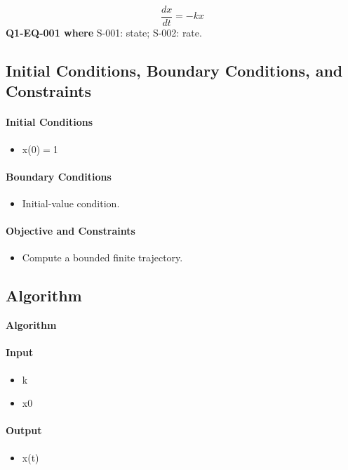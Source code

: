\documentclass[11pt]{article}
\begin{document}
\begin{equation}\label{eq:Q1-EQ-001}
\frac{dx}{dt}=-kx
\end{equation}
\noindent\textbf{Q1-EQ-001 where} S-001: state; S-002: rate.

\subsection{Initial Conditions, Boundary Conditions, and Constraints}

\paragraph{Initial Conditions}
\begin{itemize}\raggedright
\item x(0)\ensuremath{=}1
\end{itemize}

\paragraph{Boundary Conditions}
\begin{itemize}\raggedright
\item Initial-value condition.
\end{itemize}

\paragraph{Objective and Constraints}
\begin{itemize}\raggedright
\item Compute a bounded finite trajectory.
\end{itemize}

\subsection{Algorithm}

\noindent\textbf{Algorithm}
\paragraph{Input}
\begin{itemize}\raggedright
\item k
\item x0
\end{itemize}
\paragraph{Output}
\begin{itemize}\raggedright
\item x(t)
\end{itemize}
\end{document}
